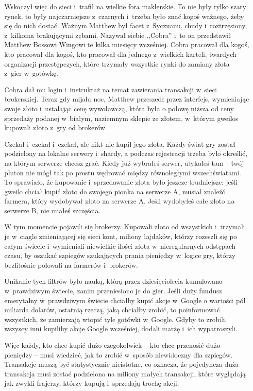 \documentclass[oneside,polish,11pt,rmheadings]{mwbk}
\begin{document}
Wskoczył więc do sieci i~trafił na wielkie fora maklerskie. To nie były tylko szary rynek, to były najczarniejsze z~czarnych i~trzeba było znać kogoś ważnego, żeby się do nich dostać. Ważnym Matthew był facet z~Syczuanu, chudy i~roztrzęsiony, z~kilkoma brakującymi zębami. Nazywał siebie ,,Cobra'' i~to on przedstawił Matthew Bossowi Wingowi te kilka miesięcy wcześniej. Cobra pracował dla kogoś, kto pracował dla kogoś, kto pracował dla jednego z~wielkich karteli, twardych organizacji przestępczych, które trzymały wszystkie rynki do zamiany złota z~gier w~gotówkę. 


Cobra dał mu login i~instruktaż na temat zawierania transakcji w~sieci brokerskiej. Teraz gdy mijała noc, Matthew przeszedł przez interfejs, wymieniając swoje złoto i~ustalając cenę wywoławczą, która była o połowę niższa od ceny sprzedaży podanej w~białym, naziemnym sklepie ze złotem, w~którym gweilos kupowali złoto z~gry od brokerów. 


Czekał i~czekał i~czekał, ale nikt nie kupił jego złota. Każdy świat gry został podzielony na lokalne serwery i~shardy, a podczas rejestracji trzeba było określić, na którym serwerze chcesz grać. Kiedy już wybrałeś serwer, utykałeś tam -- twój pluton nie mógł tak po prostu wędrować między równoległymi wszechświatami. To sprawiało, że kupowanie i~sprzedawanie złota było jeszcze trudniejsze: jeśli gweilo chciał kupić złoto do swojego pionka na serwerze A, musiał znaleźć farmera, który wydobywał złoto na serwerze A. Jeśli wydobyłeś całe złoto na serwerze B, nie miałeś szczęścia. 


W tym momencie pojawili się brokerzy. Kupowali złoto od wszystkich i~trzymali je w~ciągle zmieniającej się sieci kont, miliony łajdaków, którzy rozeszli się po całym świecie i~wymieniali niewielkie ilości złota w~nieregularnych odstępach czasu, by oszukać szpiegów szukających prania pieniędzy w~logice gry, którzy bezlitośnie polowali na farmerów i~brokerów. 


Unikanie tych filtrów było nauką, którą przez dziesięciolecia kumulowano w~prawdziwym świecie, zanim przeniesiono je do gier. Jeśli duży fundusz emerytalny w~prawdziwym świecie chciałby kupić akcje w~Google o wartości pół miliarda dolarów, ostatnią rzeczą, jaką chciałby zrobić, to poinformować wszystkich, że zamierzają wtopić tyle gotówki w~Google. Gdyby to zrobili, wszyscy inni kupiliby akcje Google wcześniej, dodali marżę i~ich wypatroszyli. 


Więc każdy, kto chce kupić dużo czegokolwiek -- kto chce przenosić dużo pieniędzy -- musi wiedzieć, jak to zrobić w~sposób niewidoczny dla szpiegów. Transakcje muszą być statystycznie nieistotne, co oznacza, że pojedyncza duża transakcja musi zostać podzielona na miliony małych transakcji, które wyglądają jak zwykli frajerzy, którzy kupują i~sprzedają trochę akcji. 
\end{document}
